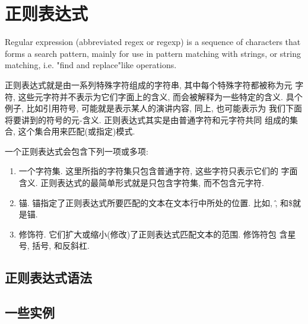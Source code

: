 \section{正则表达式}

Regular expression (abbreviated regex or
regexp) is a sequence of characters that forms a search pattern,
mainly for use in pattern matching with strings, or string matching,
i.e. "find and replace"\-like operations.

正则表达式就是由一系列特殊字符组成的字符串, 其中每个特殊字符都被称为元
字符, 这些元字符并不表示为它们字面上的含义, 而会被解释为一些特定的含义.
具个例子, 比如引用符号, 可能就是表示某人的演讲内容, 同上, 也可能表示为
我们下面将要讲到的符号的元-含义. 正则表达式其实是由普通字符和元字符共同
组成的集合, 这个集合用来匹配(或指定)模式.

一个正则表达式会包含下列一项或多项:

\begin{enumerate}[itemsep=0pt,parsep=0pt]
\item 一个字符集. 这里所指的字符集只包含普通字符, 这些字符只表示它们的
  字面含义. 正则表达式的最简单形式就是只包含字符集, 而不包含元字符.
\item 锚. 锚指定了正则表达式所要匹配的文本在文本行中所处的位置. 比如,
  \^, 和\$就是锚.
\item 修饰符. 它们扩大或缩小(修改)了正则表达式匹配文本的范围. 修饰符包
  含星号, 括号, 和反斜杠.
\end{enumerate}

\subsection{正则表达式语法}

\subsection{一些实例}
